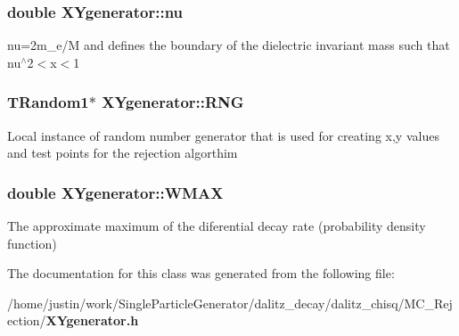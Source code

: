 \subsubsection{\setlength{\rightskip}{0pt plus 5cm}double \bf{XYgenerator::nu}\hspace{0.3cm}{\tt  [private]}}\label{classXYgenerator_f1891c4a4ccaf75a427dba56ac6fa4d2}


nu=2m\_\-e/M and defines the boundary of the dielectric invariant mass such that nu$^\wedge$2$<$x$<$1 
\subsubsection{\setlength{\rightskip}{0pt plus 5cm}TRandom1$\ast$ \bf{XYgenerator::RNG}\hspace{0.3cm}{\tt  [private]}}\label{classXYgenerator_c9581d61e340997d78f9974eb380cac9}


Local instance of random number generator that is used for creating x,y values and test points for the rejection algorthim 
\subsubsection{\setlength{\rightskip}{0pt plus 5cm}double \bf{XYgenerator::WMAX}\hspace{0.3cm}{\tt  [private]}}\label{classXYgenerator_ea8977f81d34d76f2063d8248c2750e0}


The approximate maximum of the diferential decay rate (probability density function) 

The documentation for this class was generated from the following file:\begin{CompactItemize}
\item 
/home/justin/work/Single\-Particle\-Generator/dalitz\_\-decay/dalitz\_\-chisq/MC\_\-Rejection/\bf{XYgenerator.h}\end{CompactItemize}
